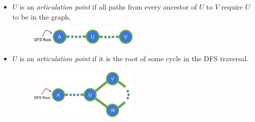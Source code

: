 \documentclass[twoside, openany]{book}
\begin{document}
\begin{itemize}
  \item[\bullet] $U$ is an \textit{articulation point} if all paths from every ancestor of $U$ to $V$
        require $U$ to be in the graph.
        \begin{figure}[H]
          \centering
          \includegraphics[width=0.5\textwidth]{"Images/Graph Theory/Articulation Points And Bridges/g9.pdf"}
          \caption{}
          \label{fig:apb_g3}
        \end{figure}
  \item[\bullet] $U$ is an \textit{articulation point} if it is the root of some cycle in the DFS traversal.
        \begin{figure}[H]
          \centering
          \includegraphics[width=0.5\textwidth]{"Images/Graph Theory/Articulation Points And Bridges/g8.pdf"}
          \caption{}
          \label{fig:apb_g3}
        \end{figure}
\end{itemize}
\begin{multicols*}{2}
\end{multicols*}
\end{document}
